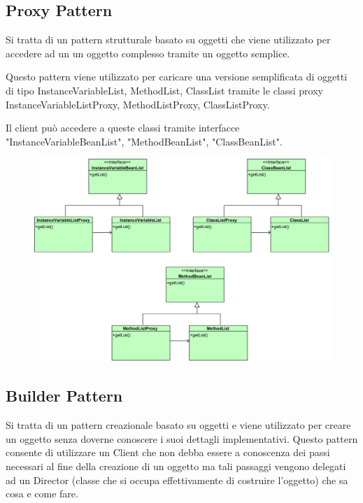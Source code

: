 \documentclass[11pt]{article}
\begin{document}
	
		\subsection{Proxy Pattern}
	
	Si tratta di un pattern strutturale basato su oggetti che viene utilizzato per accedere
	ad un un oggetto complesso tramite un oggetto semplice.
	
	Questo pattern viene utilizzato per caricare una versione semplificata di oggetti di tipo
	InstanceVariableList, MethodList, ClassList tramite le classi proxy InstanceVariableListProxy,
	MethodListProxy, ClassListProxy.
	
	Il client può accedere a queste classi tramite interfacce "InstanceVariableBeanList",
	"MethodBeanList", "ClassBeanList".
	
	 \begin{figure}[!h]
		\centering
		\includegraphics[width=13cm]{diagrams/ProxyPattern}
	\end{figure}	
	

	\subsection{Builder Pattern}
	
	Si tratta di un pattern creazionale basato su oggetti e viene utilizzato per creare un oggetto senza doverne conoscere i suoi dettagli implementativi.
	Questo pattern consente di utilizzare un Client che non debba essere a conoscenza dei passi necessari al fine della creazione di un oggetto ma tali passaggi
	vengono delegati ad un Director (classe che si occupa effettivamente di costruire l'oggetto) che sa cosa e come fare.
	
\end{document}
